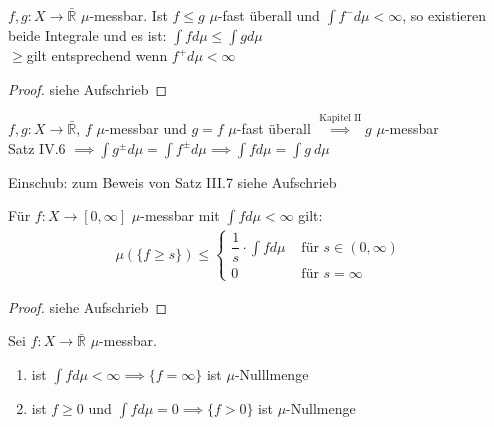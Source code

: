 \documentclass[11pt,a4paper,fleqn,openany]{report}
\begin{document}
    \begin{theorem}
      $f,g:X \to \bar{\mathbb{R}}$ $\mu$-messbar. Ist $f \leq g$ $\mu$-fast überall und $\int f^- d\mu < \infty$, so existieren beide Integrale und es ist: $\int f d\mu \leq \int g d\mu$\\
      \glqq$\geq$\grqq gilt entsprechend wenn $f^+ d\mu < \infty$
    \end{theorem}

    \begin{proof}
      siehe Aufschrieb
    \end{proof}

    \begin{remark}
      $f,g: X \to \bar{\mathbb{R}}$, $f$ $\mu$-messbar und $g = f$ $\mu$-fast überall $\stackrel{\text{Kapitel II}}{\implies} g$ $\mu$-messbar\\
      Satz IV.6 $\implies \int g^{\pm} d\mu = \int f^{\pm} d\mu \implies \int f d\mu = \int g \ d\mu$
    \end{remark}


    \begin{remark}
      Einschub: zum Beweis von Satz III.7
      siehe Aufschrieb
    \end{remark}

    \begin{lemma}
      Für $f:X \to [0, \infty]$ $\mu$-messbar mit $\int f d\mu < \infty$ gilt:
      \begin{align*}
        \mu(\{f\geq s\}) \leq \begin{cases}
          \dfrac{1}{s} \cdot \int f d\mu & \text{ für } s \in (0, \infty)\\
          0 & \text{ für } s = \infty
        \end{cases}
      \end{align*}
    \end{lemma}

    \begin{proof}
      siehe Aufschrieb
    \end{proof}

    \begin{lemma}
      Sei $f: X \to \bar{\mathbb{R}}$ $\mu$-messbar.
      \begin{enumerate}[label=\roman*)]
        \item ist $\int f d\mu < \infty \implies \{f = \infty\}$ ist $\mu$-Nulllmenge
        \item ist $f \geq 0$ und $\int f d\mu = 0 \implies \{f > 0\}$ ist $\mu$-Nullmenge
      \end{enumerate}
    \end{lemma}
\end{document}
